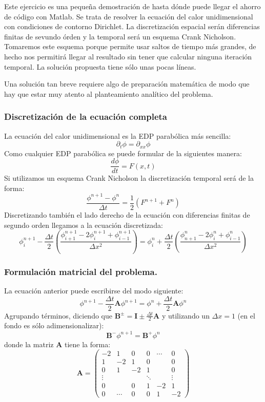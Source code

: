 Este ejercicio es una pequeña demostración de hasta dónde puede llegar
el ahorro de código con Matlab. Se trata de resolver la ecuación del
calor unidimensional con condiciones de contorno Dirichlet. La
discretización espacial serán diferencias finitas de sevundo órden y
la temporal será un esquema Crank Nicholson. Tomaremos este esquema
porque permite usar saltos de tiempo más grandes, de hecho nos
permitirá llegar al resultado sin tener que calcular ninguna iteración
temporal. La solución propuesta tiene sólo unas pocas líneas.

Una solución tan breve requiere algo de preparación matemática de modo
que hay que estar muy atento al planteamiento analítico del problema.


\subsubsection*{Discretización de la ecuación completa}

La ecuación del calor unidimensional es la EDP parabólica más
sencilla:
$$\partial_{t}\phi=\partial_{xx}\phi$$
 Como cualquier EDP parabólica se
puede formular de la siguientes manera:
$$ \frac{d\phi}{dt}=F(x,t)$$ 
Si
utilizamos un esquema Crank Nicholson la discretización temporal será
de la forma:
$$ \frac{\phi^{n+1}-\phi^{n}}{\Delta
  t}=\frac{1}{2}\left(F^{n+1}+F^{n}\right)$$
 Discretizando también el
lado derecho de la ecuación con diferencias finitas de segundo orden
llegamos a la ecuación discretizada:$$ \phi_{i}^{n+1}-\frac{\Delta
  t}{2}\left(\frac{\phi_{i+1}^{n+1}-2\phi_{i}^{n+1}+\phi_{i-1}^{n+1}}{\Delta
    x^{2}}\right)=\phi_{i}^{n}+\frac{\Delta
  t}{2}\left(\frac{\phi_{n+1}^{n}-2\phi_{i}^{n}+\phi_{i-1}^{n}}{\Delta
    x^{2}}\right)$$



\subsubsection*{Formulación matricial del problema.}

La ecuación anterior puede escribirse del modo siguiente:\[
\phi^{n+1}-\frac{\Delta
  t}{2}\mathbf{A}\phi^{n+1}=\phi^{n}+\frac{\Delta
  t}{2}\mathbf{A}\phi^{n}\] Agrupando términos, diciendo que
$\mathbf{B}^{\pm}=\mathbf{I}\pm\frac{\Delta t}{2}\mathbf{A}$ y
utilizando un $\Delta x=1$ (en el fondo es sólo adimensionalizar):\[
\mathbf{B}^{-}\phi^{n+1}=\mathbf{B}^{+}\phi^{n}\] donde la matriz
$\mathbf{A}$ tiene la forma:\[ \mathbf{A}=\left(\begin{array}{cccccc}
    -2 & 1 & 0 & 0 & \cdots & 0\\
    1 & -2 & 1 & 0 &  & 0\\
    0 & 1 & -2 & 1 &  & 0\\
    \vdots &  &  & \ddots &  & \vdots\\
    0 &  & 0 & 1 & -2 & 1\\
    0 & \cdots & 0 & 0 & 1 & -2\end{array}\right)\]



